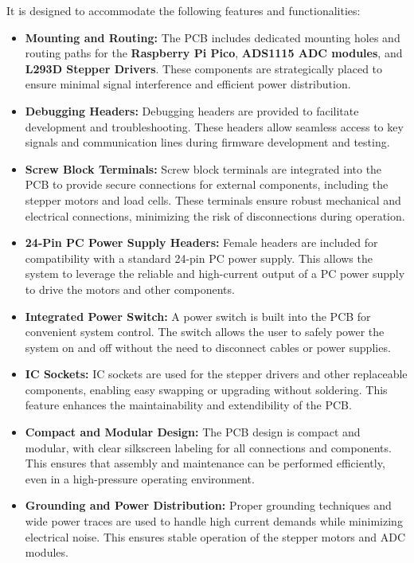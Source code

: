 It is designed to accommodate the following features and functionalities:

\begin{itemize}
    \item \textbf{Mounting and Routing:} The PCB includes dedicated mounting holes and routing paths for the \textbf{Raspberry Pi Pico}, \textbf{ADS1115 ADC modules}, and \textbf{L293D Stepper Drivers}. These components are strategically placed to ensure minimal signal interference and efficient power distribution.

    \item \textbf{Debugging Headers:} Debugging headers are provided to facilitate development and troubleshooting. These headers allow seamless access to key signals and communication lines during firmware development and testing.

    \item \textbf{Screw Block Terminals:} Screw block terminals are integrated into the PCB to provide secure connections for external components, including the stepper motors and load cells. These terminals ensure robust mechanical and electrical connections, minimizing the risk of disconnections during operation.

    \item \textbf{24-Pin PC Power Supply Headers:} Female headers are included for compatibility with a standard 24-pin PC power supply. This allows the system to leverage the reliable and high-current output of a PC power supply to drive the motors and other components.

    \item \textbf{Integrated Power Switch:} A power switch is built into the PCB for convenient system control. The switch allows the user to safely power the system on and off without the need to disconnect cables or power supplies.

    \item \textbf{IC Sockets:} IC sockets are used for the stepper drivers and other replaceable components, enabling easy swapping or upgrading without soldering. This feature enhances the maintainability and extendibility of the PCB.

    \item \textbf{Compact and Modular Design:} The PCB design is compact and modular, with clear silkscreen labeling for all connections and components. This ensures that assembly and maintenance can be performed efficiently, even in a high-pressure operating environment.

    \item \textbf{Grounding and Power Distribution:} Proper grounding techniques and wide power traces are used to handle high current demands while minimizing electrical noise. This ensures stable operation of the stepper motors and ADC modules.
\end{itemize}

